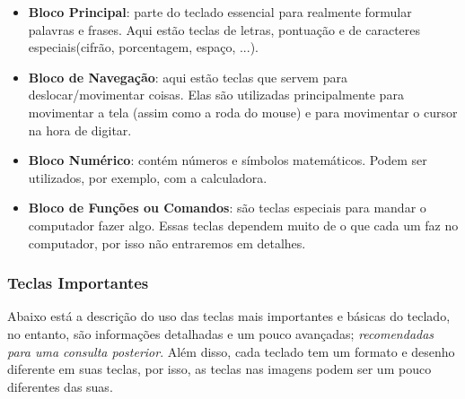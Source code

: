 \documentclass[hidelinks,12pt]{article}
\begin{document}
\begin{itemize}
	
		\item \textbf{Bloco Principal}: parte do teclado essencial para realmente formular palavras e frases. Aqui estão teclas de letras, pontuação e de caracteres especiais(cifrão, porcentagem, espaço, ...).
		
		\item \textbf{Bloco de Navegação}: aqui estão teclas que servem para deslocar/movimentar coisas. Elas são utilizadas principalmente para movimentar a tela (assim como a roda do mouse) e para movimentar o cursor na hora de digitar.
		
		\item \textbf{Bloco Numérico}: contém números e símbolos matemáticos. Podem ser utilizados, por exemplo, com a calculadora.
		
		\item \textbf{Bloco de Funções ou Comandos}: são teclas especiais para mandar o computador fazer algo. Essas teclas dependem muito de o que cada um faz no computador, por isso não entraremos em detalhes.
		
\end{itemize}	



\subsubsection{Teclas Importantes}

Abaixo está a descrição do uso das teclas mais importantes e básicas do teclado, no entanto, são informações detalhadas e um pouco avançadas; \textit{recomendadas para uma consulta posterior}. Além disso, cada teclado tem um formato e desenho diferente em suas teclas, por isso, as teclas nas imagens podem ser um pouco diferentes das suas.
\end{document}
